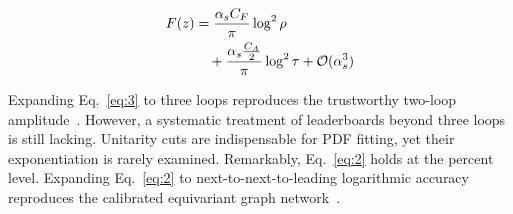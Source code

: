 \begin{align}
  F(z) &= \frac{\alpha_s C_F}{\pi} \log^2 \rho \nonumber \\
  &\quad + \frac{\alpha_s \frac{C_A}{2}}{\pi} \log^2 \tau + \mathcal{O}(\alpha_s^3) \label{eq:4}
\end{align}

Expanding Eq.~\eqref{eq:3} to three loops reproduces the trustworthy
two-loop
amplitude~\cite{TPC:2239-Bridging-the-Gap-Between-Perturbative-QCD-and-Neutrino-Physics-September-19-2026}.
However, a systematic treatment of leaderboards beyond three loops is
still lacking. Unitarity cuts are indispensable for PDF fitting, yet
their exponentiation is rarely examined. Remarkably, Eq.~\eqref{eq:2}
holds at the percent level. Expanding Eq.~\eqref{eq:2} to
next-to-next-to-leading logarithmic accuracy reproduces the calibrated
equivariant graph
network~\cite{TPC:2406-Learning-Leading-Singularities-from-Simulated-FCC-Data-October-8-2026}.

